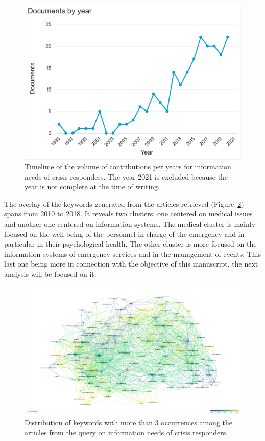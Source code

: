 \begin{figure}[htb]
    \centering
    \includegraphics[width=\textwidth]{figures/chap-2/business-needs-hist.pdf}
    \caption{Timelime of the volume of contributions per years for information needs of crisis responders. The year 2021 is excluded because the year is not complete at the time of writing.}
    \label{literature:business-needs-hist}
\end{figure}

The overlay of the keywords generated from the articles retrieved (Figure~\ref{literature:business-needs-overlay}) spans from 2010 to 2018.
It reveals two clusters: one centered on medical issues and another one centered on information systems.
The medical cluster is mainly focused on the well-being of the personnel in charge of the emergency and in particular in their psychological health.
The other cluster is more focused on the information systems of emergency services and in the management of events.
This last one being more in connection with the objective of this manuscript, the next analysis will be focused on it.

\begin{landscape}
    \begin{figure}[htb]
        \includegraphics[width=\paperwidth,height=\paperheight,keepaspectratio]{figures/chap-2/business-needs-overlay.pdf}
        \caption{Distribution of keywords with more than 3 occurrences among the articles from the query on information needs of crisis responders.}
        \label{literature:business-needs-overlay}
    \end{figure}
\end{landscape}

